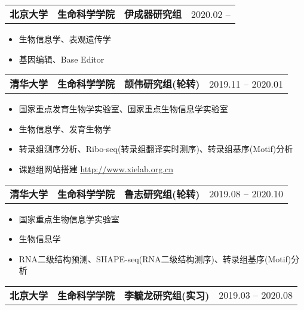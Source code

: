 \documentclass{resume}
\begin{document}
	\begin{tabularx}{\textwidth}{@{}X X X r@{}}
			\textbf{北京大学} & \textbf{生命科学学院} & \textbf{伊成器研究组} & 2020.02 -- \space\space\space\space\space\space\space\space\space\space\space\space\space\space \\
	\end{tabularx}

			\begin{itemize}
			 		\item 生物信息学、表观遗传学
					\item 基因编辑、Base Editor
			\end{itemize}



	\begin{tabularx}{\textwidth}{@{}X X X r@{}}
			\textbf{清华大学} & \textbf{生命科学学院} & \textbf{颉伟研究组(轮转)} & 2019.11 -- 2020.01 \\
	\end{tabularx}

			\begin{itemize}
					\item 国家重点发育生物学实验室、国家重点生物信息学实验室
					\item 生物信息学、发育生物学
					\item 转录组测序分析、Ribo-seq(转录组翻译实时测序)、转录组基序(Motif)分析
					\item 课题组网站搭建	\hyperref[http://www.xielab.org.cn]{\underline{http://www.xielab.org.cn}}
			\end{itemize}

	\begin{tabularx}{\textwidth}{@{}X X X r@{}}
			\textbf{清华大学} & \textbf{生命科学学院} & \textbf{鲁志研究组(轮转)} & 2019.08 -- 2020.10 \\
	\end{tabularx}

			\begin{itemize}
					\item 国家重点生物信息学实验室
					\item 生物信息学
					\item RNA二级结构预测、SHAPE-seq(RNA二级结构测序)、转录组基序(Motif)分析
			\end{itemize}
		
	\begin{tabularx}{\textwidth}{@{}X X X r@{}}
			\textbf{北京大学} & \textbf{生命科学学院} & \textbf{李毓龙研究组(实习)} & 2019.03 -- 2020.08 \\
	\end{tabularx}
\end{document}
